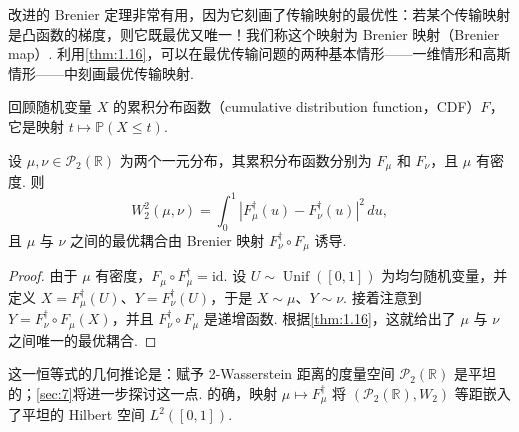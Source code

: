 改进的 Brenier 定理非常有用，因为它刻画了传输映射的最优性：若某个传输映射是凸函数的梯度，则它既最优又唯一！我们称这个映射为 Brenier 映射（Brenier map）. 利用\autoref{thm:1.16}，可以在最优传输问题的两种基本情形——一维情形和高斯情形——中刻画最优传输映射.

\begin{example}[一维最优传输]\label{ex:1.17}
回顾随机变量 $X$ 的累积分布函数（cumulative distribution function，CDF）$F$，它是映射 $t\mapsto\mathbb{P}(X\leq t)$.
\end{example}

\begin{proposition}\label{prop:1.18}
设 $\mu,\nu\in\mathcal{P}_2(\mathbb{R})$ 为两个一元分布，其累积分布函数分别为 $F_\mu$ 和 $F_\nu$，且 $\mu$ 有密度. 则
$$
W_2^2(\mu,\nu)=\int_0^1|F_\mu^\dagger(u)-F_\nu^\dagger(u)|^2\,du,
$$
且 $\mu$ 与 $\nu$ 之间的最优耦合由 Brenier 映射 $F_\nu^\dagger\circ F_\mu$ 诱导.
\end{proposition}
\begin{proof}
由于 $\mu$ 有密度，$F_\mu\circ F_\mu^\dagger=\mathrm{id}$. 设 $U\sim\operatorname{Unif}([0,1])$ 为均匀随机变量，并定义 $X=F_\mu^\dagger(U)$、$Y=F_\nu^\dagger(U)$，于是 $X\sim\mu$、$Y\sim\nu$. 接着注意到 $Y=F_\nu^\dagger\circ F_\mu(X)$，并且 $F_\nu^\dagger\circ F_\mu$ 是递增函数. 根据\autoref{thm:1.16}，这就给出了 $\mu$ 与 $\nu$ 之间唯一的最优耦合.
\end{proof}

这一恒等式的几何推论是：赋予 2-Wasserstein 距离的度量空间 $\mathcal{P}_2(\mathbb{R})$ 是平坦的；\autoref{sec:7}将进一步探讨这一点. 的确，映射 $\mu\mapsto F_\mu^\dagger$ 将 $(\mathcal{P}_2(\mathbb{R}),W_2)$ 等距嵌入了平坦的 Hilbert 空间 $L^2([0,1])$.

